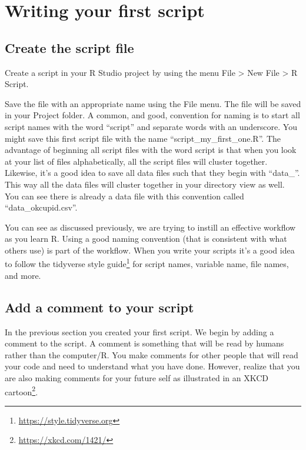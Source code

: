 \documentclass[
]{krantz}
\renewcommand{\href}[2]{#2\footnote{\url{#1}}}
\begin{document}
\hypertarget{writing-your-first-script}{%
\section{Writing your first script}\label{writing-your-first-script}}

\hypertarget{create-the-script-file}{%
\subsection{Create the script file}\label{create-the-script-file}}

Create a script in your R Studio project by using the menu File \textgreater{} New File \textgreater{} R Script.

Save the file with an appropriate name using the File menu. The file will be saved in your Project folder. A common, and good, convention for naming is to start all script names with the word ``script'' and separate words with an underscore. You might save this first script file with the name ``script\_my\_first\_one.R''. The advantage of beginning all script files with the word script is that when you look at your list of files alphabetically, all the script files will cluster together. Likewise, it's a good idea to save all data files such that they begin with ``data\_''. This way all the data files will cluster together in your directory view as well. You can see there is already a data file with this convention called ``data\_okcupid.csv''.

You can see as discussed previously, we are trying to instill an effective workflow as you learn R. Using a good naming convention (that is consistent with what others use) is part of the workflow. When you write your scripts it's a good idea to follow the \href{https://style.tidyverse.org}{tidyverse style guide} for script names, variable name, file names, and more.

\hypertarget{add-a-comment-to-your-script}{%
\subsection{Add a comment to your script}\label{add-a-comment-to-your-script}}

In the previous section you created your first script. We begin by adding a comment to the script. A comment is something that will be read by humans rather than the computer/R. You make comments for other people that will read your code and need to understand what you have done. However, realize that you are also making comments for your future self as illustrated in an \href{https://xkcd.com/1421/}{XKCD cartoon}.
\end{document}
